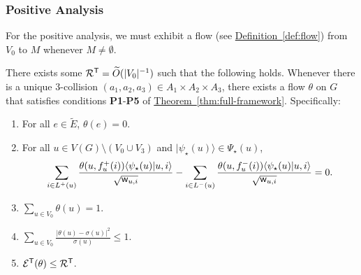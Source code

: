 \documentclass{theoretics}
\newcommand{\thm}[1]{\hyperref[thm:#1]{Theorem~\ref*{thm:#1}}}
\newcommand{\defin}[1]{\hyperref[def:#1]{Definition~\ref*{def:#1}}}
\def\ket#1{{\lvert}#1\rangle}
\renewcommand{\>}{\rangle}
\newcommand{\<}{\langle}
\renewcommand{\(}{\left(}
\renewcommand{\)}{\right)}
\def\braket#1#2{{{\langle}#1\vert}#2\rangle}
\def\w{{\sf w}}
\begin{document}
\subsubsection{Positive Analysis}

For the positive analysis, we must exhibit a flow (see \defin{flow}) from $V_0$ to $M$ whenever $M\neq \emptyset$.

\begin{lemma}\label{lem:3-dist-positive}
There exists some ${\cal R}^{\sf T}=\widetilde{O}(|V_0|^{-1})$ such that the following holds. Whenever there is a unique $3$-collision $(a_1,a_2,a_3)\in A_1\times A_2\times A_3$, there exists a flow $\theta$ on $G$ that satisfies conditions \textbf{P1}-\textbf{P5} of \thm{full-framework}. Specifically:
\begin{enumerate}
	\item For all $e\in\tilde{E}$, $\theta(e)=0$.
	\item For all $u\in V(G)\setminus (V_0\cup V_3)$ and $\ket{\psi_\star(u)}\in \Psi_\star(u)$, 
$$\sum_{i\in L^+(u)}\frac{\theta(u,f^+_u(i))\braket{\psi_\star(u)}{u,i}}{\sqrt{\w_{u,i}}}-\sum_{i\in L^-(u)}\frac{\theta(u,f^-_u(i))\braket{\psi_\star(u)}{u,i}}{\sqrt{\w_{u,i}}}=0.$$
	\item $\sum_{u\in  V_0}\theta(u)=1$.
	\item $\sum_{u\in V_0}\frac{|\theta(u)-\sigma(u)|^2}{\sigma(u)}\leq 1$.
	\item ${\cal E}^{\sf T}(\theta)\leq {\cal R}^{\sf T}$.
\end{enumerate}
\end{lemma}
\end{document}
